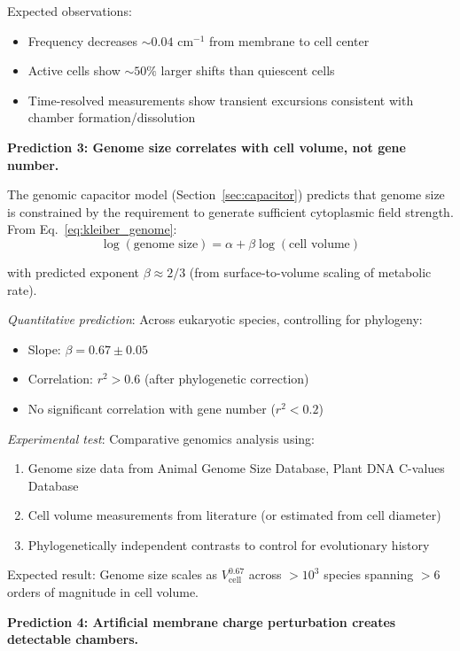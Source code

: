 \documentclass[twocolumn,10pt,aps,prd,superscriptaddress,floatfix,nofootinbib]{revtex4-2}
\theoremstyle{remark}
\begin{document}
Expected observations:
\begin{itemize}
\item Frequency decreases $\sim 0.04$ cm$^{-1}$ from membrane to cell center
\item Active cells show $\sim 50\%$ larger shifts than quiescent cells
\item Time-resolved measurements show transient excursions consistent with chamber formation/dissolution
\end{itemize}

\textbf{Prediction 3: Genome size correlates with cell volume, not gene number.}

The genomic capacitor model (Section~\ref{sec:capacitor}) predicts that genome size is constrained by the requirement to generate sufficient cytoplasmic field strength. From Eq.~\eqref{eq:kleiber_genome}:
\begin{equation}
\log(\text{genome size}) = \alpha + \beta\log(\text{cell volume})
\label{eq:pred_genome_scaling}
\end{equation}

with predicted exponent $\beta \approx 2/3$ (from surface-to-volume scaling of metabolic rate).

\textit{Quantitative prediction}: Across eukaryotic species, controlling for phylogeny:
\begin{itemize}
\item Slope: $\beta = 0.67 \pm 0.05$
\item Correlation: $r^2 > 0.6$ (after phylogenetic correction)
\item No significant correlation with gene number ($r^2 < 0.2$)
\end{itemize}

\textit{Experimental test}: Comparative genomics analysis using:
\begin{enumerate}
\item Genome size data from Animal Genome Size Database, Plant DNA C-values Database
\item Cell volume measurements from literature (or estimated from cell diameter)
\item Phylogenetically independent contrasts to control for evolutionary history
\end{enumerate}

Expected result: Genome size scales as $V_{\mathrm{cell}}^{0.67}$ across $>10^3$ species spanning $>6$ orders of magnitude in cell volume.

\textbf{Prediction 4: Artificial membrane charge perturbation creates detectable chambers.}
\end{document}
